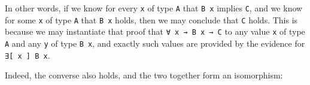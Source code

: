 \begin{fence}
\begin{code}%
\>[0]\AgdaSpace{}%
\AgdaSymbol{:}\AgdaSpace{}%
\AgdaSpace{}%
\AgdaSymbol{\{}\AgdaSpace{}%
\AgdaSymbol{:}\AgdaSpace{}%
\AgdaSymbol{\}}\AgdaSpace{}%
\AgdaSymbol{\{}\AgdaSpace{}%
\AgdaSymbol{:}\AgdaSpace{}%
\AgdaSpace{}%
\AgdaSpace{}%
\AgdaSymbol{\}}\AgdaSpace{}%
\AgdaSymbol{\{}\AgdaSpace{}%
\AgdaSymbol{:}\AgdaSpace{}%
\AgdaSymbol{\}}\<%
\\
\>[0][@{}l@{\AgdaIndent{0}}]%
\>[2]\AgdaSpace{}%
\AgdaSpace{}%
\AgdaSpace{}%
\AgdaSpace{}%
\AgdaSpace{}%
\AgdaSpace{}%
\AgdaSpace{}%
\AgdaSymbol{)}\<%
\\
%
\>[2]%
\>[260I]\AgdaFunction{∃[}\AgdaSpace{}%
\AgdaSpace{}%
\AgdaFunction{]}\AgdaSpace{}%
\AgdaSpace{}%
\<%
\\
\>[.][@{}l@{}]\<[260I]%
\>[4]\AgdaComment{---------------}\<%
\\
%
\>[2]\AgdaSpace{}%
\<%
\\
\>[0]\AgdaSpace{}%
\AgdaSpace{}%
\AgdaSpace{}%
\AgdaSpace{}%
\AgdaOperator{\AgdaInductiveConstructor{,}}\AgdaSpace{}%
\AgdaSpace{}%
\AgdaSpace{}%
\AgdaSymbol{=}\AgdaSpace{}%
\AgdaSpace{}%
\AgdaSpace{}%
\<%
\end{code}
\end{fence}

In other words, if we know for every \texttt{x} of type \texttt{A} that
\texttt{B\ x} implies \texttt{C}, and we know for some \texttt{x} of
type \texttt{A} that \texttt{B\ x} holds, then we may conclude that
\texttt{C} holds. This is because we may instantiate that proof that
\texttt{∀\ x\ →\ B\ x\ →\ C} to any value \texttt{x} of type \texttt{A}
and any \texttt{y} of type \texttt{B\ x}, and exactly such values are
provided by the evidence for \texttt{∃{[}\ x\ {]}\ B\ x}.

Indeed, the converse also holds, and the two together form an
isomorphism:

